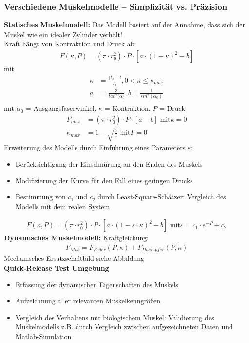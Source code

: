 \subsubsection{Verschiedene Muskelmodelle – Simplizität vs. Präzision}
\textbf{Statisches Muskelmodell:} Das Modell basiert auf der Annahme, dass sich
der Muskel wie ein idealer Zylinder verhält!\\
Kraft hängt von Kontraktion und Druck ab:\\
\begin{align*}
	F(\kappa, P) = (\pi \cdot r_0^2) \cdot P \cdot \left[a \cdot (1 - \kappa)^2 - b\right]
\end{align*}
mit
\begin{align*}
	\kappa &= \frac{(l_0 - l}{l_0}, 0 < \kappa \leq \kappa_{max}\\
	a &= \frac{3}{tan^2(\alpha_0}, b = \frac{1}{sin^2(\alpha_0)}\\
\end{align*} mit $\alpha_0$ = Ausgangsfaserwinkel, $\kappa$ = Kontraktion, $P$ = Druck\\
\begin{align*}
	F_{max} &= (\pi \cdot r_0^2) \cdot P \cdot \left[a - b\right] \text{ mit} \kappa = 0\\
	\kappa_{max} &= 1 - \sqrt{\frac{b}{a}} \text{ mit} F = 0
\end{align*}
Erweiterung des Modells durch Einführung eines Parameters $\varepsilon$:
\begin{itemize}
	\item Berücksichtigung der Einschnürung an den Enden des Muskels
	\item Modifizierung der Kurve für den Fall eines geringen Drucks
	\item Bestimmung von $c_1$ und $c_2$ durch Least-Square-Schätzer: Vergleich des Modells mit dem realen System
\end{itemize}
\begin{align*}
	F(\kappa, P) = (\pi \cdot r_0^2) \cdot P \cdot \left[a \cdot (1 - \varepsilon \cdot \kappa)^2 - b\right] \text{ mit} \varepsilon = c_1 \cdot e^{-P} + c_2
\end{align*}
\noindent
\textbf{Dynamisches Muskelmodell:}
Kraftgleichung:
\begin{align*}
	F_{Mus} = F_{Feder}(P, \kappa) + F_{Daempfer}(P, \dot{\kappa})   
\end{align*}
Mechanisches Ersatzschaltbild siehe Abbildung\\
\noindent
\textbf{Quick-Release Test Umgebung}
\begin{itemize}
	\item Erfassung der dynamischen Eigenschaften des Muskels
	\item Aufzeichnung aller relevanten Muskelkenngrößen
	\item Vergleich des Verhaltens mit biologischem Muskel: Validierung des Muskelmodells z.B. durch Vergleich zwischen aufgezeichneten Daten und Matlab-Simulation
\end{itemize}

